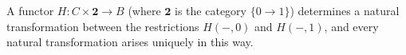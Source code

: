 A functor $H: C \times \mathbf{2} \to B$ (where $\mathbf{2}$ is the category $\{0 \to 1\}$) determines a natural transformation between the restrictions $H(-, 0)$ and $H(-, 1)$, and every natural transformation arises uniquely in this way.
